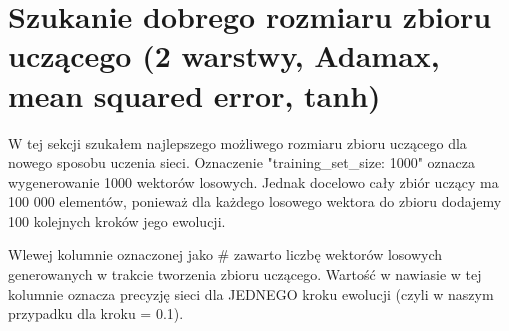\documentclass{article}
\begin{document}
\section{Szukanie dobrego rozmiaru zbioru uczącego (2 warstwy, Adamax, mean squared error, tanh)}

W tej sekcji szukałem najlepszego możliwego rozmiaru zbioru uczącego dla nowego sposobu uczenia sieci. Oznaczenie "training\_set\_size: 1000" oznacza wygenerowanie 1000 wektorów losowych. Jednak docelowo cały zbiór uczący ma 100 000 elementów, ponieważ dla każdego losowego wektora do zbioru dodajemy 100 kolejnych kroków jego ewolucji.

Wlewej kolumnie oznaczonej jako \# zawarto liczbę wektorów losowych generowanych w trakcie tworzenia zbioru uczącego. Wartość w nawiasie w tej kolumnie oznacza precyzję sieci dla JEDNEGO kroku ewolucji (czyli w naszym przypadku dla kroku = 0.1).
\end{document}

